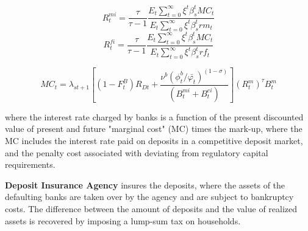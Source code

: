 \documentclass[12pt]{article}
\numberwithin{equation}{section}
\begin{document}

\begin{equation}
R^{mi}_t=\frac{\tau}{\tau-1}\frac{E_t\sum _{t=0}^{\infty }\xi^t\beta_{s}^t MC_t}{E_t\sum _{t=0}^{\infty }\xi^t\beta_{s}^t rm_t}
\end{equation}
\begin{equation}
R^{fi}_t=\frac{\tau}{\tau-1}\frac{E_t\sum _{t=0}^{\infty }\xi^t\beta_{s}^t MC_t}{E_t\sum _{t=0}^{\infty }\xi^t\beta_{s}^t rf_t}
\end{equation}

\begin{equation}
MC_t=\lambda_{st+1}[(1-F^B_t)R_{Dt}+\frac{\nu^b(\phi^b_t/{\bar{\varphi_t}})^{(1-\sigma)}}{(B^{mi}_t+B^{ei}_t)}](R^m_t)^\tau B^m_t
\end{equation}

where the interest rate charged by banks is a function of the present discounted value of present and future "marginal cost" (MC) times the mark-up, where the MC includes the interest rate paid on deposits in a competitive deposit market, and the penalty cost associated with deviating from regulatory capital requirements.  

\textbf{Deposit Insurance Agency} insures the deposits, where the assets of the defaulting banks are taken over by the agency and are subject to bankruptcy costs. The difference between the amount of deposits and the value of realized assets is recovered by imposing a lump-sum tax on households. 
\end{document}
